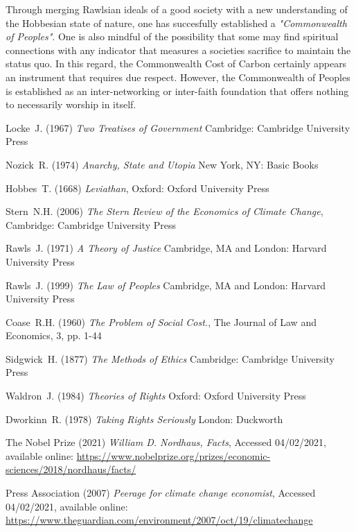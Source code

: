 \documentclass[11pt, oneside]{article}   	%
\begin{document}
Through merging Rawlsian ideals of a good society with a new understanding of the Hobbesian state of nature, one has succesfully established a \emph{"Commonwealth of Peoples"}.
One is also mindful of the possibility that some may find spiritual connections with any indicator that measures a societies sacrifice to maintain the status quo.
In this regard, the Commonwealth Cost of Carbon certainly appears an instrument that requires due respect.
However, the Commonwealth of Peoples is established as an inter-networking or inter-faith foundation that offers nothing to necessarily worship in itself.\\

\begin{thebibliography}{99}

 Locke~J. (1967)
\emph{Two Treatises of Government}
Cambridge: Cambridge University Press
	
 Nozick~R. (1974)
\emph{Anarchy, State and Utopia}
New York, NY: Basic Books
	
 Hobbes~T. (1668)
\emph{Leviathan},
Oxford: Oxford University Press
	
 Stern~N.H. (2006)
\emph{The Stern Review of the Economics of Climate Change},
Cambridge: Cambridge University Press
		
 Rawls~J. (1971)
\emph{A Theory of Justice}
Cambridge, MA and London: Harvard University Press
		
 Rawls~J. (1999)
\emph{The Law of Peoples}
Cambridge, MA and London: Harvard University Press
		
 Coase~R.H. (1960)
\emph{The Problem of Social Cost.},
The Journal of Law and Economics, 3, pp. 1-44
		
 Sidgwick~H. (1877)
\emph{The Methods of Ethics}
Cambridge: Cambridge University Press
		
 Waldron~J. (1984)
\emph{Theories of Rights}
Oxford: Oxford University Press
		
 Dworkinn~R. (1978)
\emph{Taking Rights Seriously}
London: Duckworth
		
 The Nobel Prize (2021)
\emph{William D. Nordhaus, Facts},
Accessed 04/02/2021, available online: 
\url{https://www.nobelprize.org/prizes/economic-sciences/2018/nordhaus/facts/}
		
 Press Association (2007)
\emph{Peerage for climate change economist},
Accessed 04/02/2021, available online: 
\url{https://www.theguardian.com/environment/2007/oct/19/climatechange}
		

\end{thebibliography}
\end{document}
